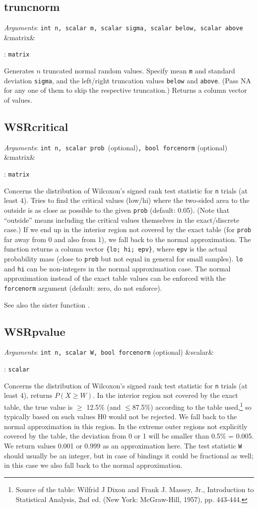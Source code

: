 \documentclass[11pt,english]{article}
\newcommand{\ArgRet}[2]{%
  {\it Arguments}: {#1}%
  \ifx&#2&%
  \else
  \par\smallskip\noindent {\it Return type}: \texttt{#2}
  \fi%
  \par\medskip\par%
  }
\begin{document}
\subsection{truncnorm}

\ArgRet{\texttt{int n, scalar m, scalar sigma, scalar below, scalar
above}}{matrix}

Generates $n$ truncated normal random values. Specify mean \texttt{m}
and standard deviation \texttt{sigma}, and the left/right truncation values
\texttt{below} and \texttt{above}. (Pass NA for any one of them to
skip the respective truncation.) Returns a column vector of values.


\subsection{WSRcritical}

\ArgRet{\texttt{int n, scalar prob }(optional)\texttt{, bool forcenorm}
(optional)}{matrix}

Concerns the distribution of Wilcoxon's signed rank test statistic for
\texttt{n} trials (at least 4). Tries to find the critical values
(low/hi) where the two-sided area to the outside is as close as
possible to the given \texttt{prob} (default: 0.05). (Note that
``outside'' means including the critical values themselves in the
exact/discrete case.) If we end up in the interior region not covered
by the exact table (for \texttt{prob} far away from 0 and also from
1), we fall back to the normal approximation. The function returns a
column vector \verb|{lo; hi; epv}|, where \texttt{epv} is the actual
probability mass (close to \texttt{prob} but not equal in general for
small samples). \texttt{lo} and \texttt{hi} can be non-integers in the normal
approximation case. The normal approximation instead of the exact
table values can be enforced with the \texttt{forcenorm} argument
(default: zero, do not enforce).

See also the sister function .

\subsection{WSRpvalue}

\ArgRet{\texttt{int n, scalar W, bool forcenorm} (optional)}{scalar}

Concerns the distribution of Wilcoxon's signed rank test statistic for
\texttt{n} trials (at least 4), returns $P(X\geq W)$. In the interior
region not covered by the exact table, the true value is $\geq$ 12.5\%
(and $\leq$87.5\%) according to the table used,\footnote{Source of the
  table: Wilfrid J Dixon and Frank J. Massey, Jr., Introduction to
  Statistical Analysis, 2nd ed. (New York: McGraw-Hill, 1957), pp.
  443-444.} so typically based on such values H0 would not be
rejected. We fall back to the normal approximation in this region. In
the extreme outer regions not explicitly covered by the table, the
deviation from 0 or 1 will be smaller than 0.5\% = 0.005. We return
values 0.001 or 0.999 as an approximation here. The test statistic
\texttt{W} should usually be an integer, but in case of bindings it
could be fractional as well; in this case we also fall back to the
normal approximation.
\end{document}

